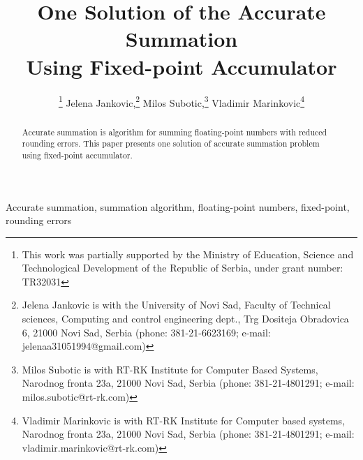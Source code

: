 \documentclass[conference]{IEEEtran}
\begin{document}
%
\title{One Solution of the Accurate Summation \\ Using Fixed-point Accumulator}


\author{
	\thanks{
		This work was partially supported by the Ministry of Education, 
		Science and Technological Development of the Republic of Serbia, 
		under grant number: TR32031
	}
	Jelena Jankovic,\thanks{
		Jelena Jankovic is with the University of Novi Sad, Faculty of Technical sciences, 
		Computing and control engineering dept., 
		Trg Dositeja Obradovica 6, 21000 Novi Sad, Serbia
		(phone: 381-21-6623169; e-mail: jelenaa31051994@gmail.com)
	}
	Milos Subotic,\thanks{
		Milos Subotic is with RT-RK Institute for Computer Based Systems,
		Narodnog fronta 23a, 21000 Novi Sad, Serbia
		(phone: 381-21-4801291; e-mail: milos.subotic@rt-rk.com)
	}
	Vladimir Marinkovic\thanks{
		Vladimir Marinkovic is with RT-RK Institute for Computer based systems,
		Narodnog fronta 23a, 21000 Novi Sad, Serbia
		(phone: 381-21-4801291; e-mail: vladimir.marinkovic@rt-rk.com)
	}
}


\maketitle


\begin{abstract}
Accurate summation is algorithm for summing floating-point numbers with reduced rounding errors.
This paper presents one solution of accurate summation problem using fixed-point accumulator.
\end{abstract}

\begin{IEEEkeywords}
Accurate summation, summation algorithm, floating-point numbers, fixed-point, rounding errors
\end{IEEEkeywords}
\end{document}
